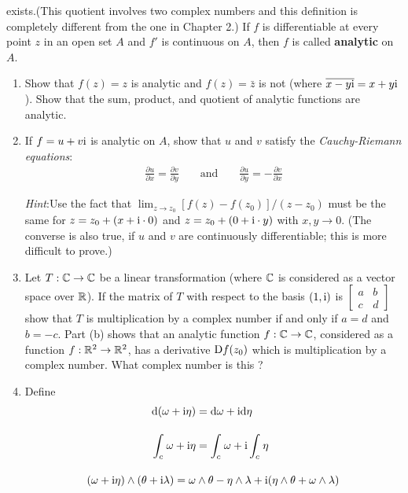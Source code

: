 \begin{problems}
{        exists.(This quotient involves two complex numbers and this
        definition is completely different from the one in Chapter 2.)
        If $f$ is differentiable at every point $z$ in an open set $A$ and $f'$ is
        continuous on $A$, then $f$ is called \textbf{analytic} on $A$.
        \begin{enumerate}[label=(\alph*)]
            \item Show that $f(z)=z$ is analytic and $f(z)=\bar{z}$ is not (where $\overline{x-y\mathrm{i}} = x+y\mathrm{i}$).
                    Show that the sum, product, and quotient of analytic functions are analytic. 
            \item If $f=u+v\mathrm{i}$ is analytic on $A$, show that $u$ and $v$ satisfy the \textit{Cauchy-Riemann equations}:
                \begin{align*}
                    \frac{\partial u}{\partial x} = \frac{\partial v}{\partial y} 
                    && \text{ and } && 
                    \frac{\partial u}{\partial y} = -\frac{\partial v}{\partial x}
                \end{align*}

                \textit{Hint}:Use the fact that $\lim_{z\to z_0}{[f(z)-f(z_0)]/(z-z_0)}$ must 
                be the same for $z=z_0+(x+\mathrm{i}\cdot 0)$ and $z=z_0+(0+\mathrm{i}\cdot y)$ with 
                $x,y\to 0$. (The converse is also true, if $u$ and $v$ are continuously differentiable;
                this is more difficult to prove.)
            \item Let $T:\mathbb{C}\to \mathbb{C}$ be a linear transformation (where $\mathbb{C}$ is considered 
                as a vector space over $\mathbb{R}$). If the matrix of $T$ with respect to the 
                basis $(1,\mathrm{i})$ is $\begin{bmatrix}a & b\\c & d\end{bmatrix}$ show that
                $T$ is multiplication by a complex number if and only if $a=d$ and $b=-c$. Part (b)
                shows that an analytic function $f:\mathbb{C}\to\mathbb{C}$, considered as a function $f:\mathbb{R}^2\to\mathbb{R}^2$,
                has a derivative $\mathrm{D}f(z_0)$ which is multiplication by a complex number. What complex number
                is this ?
            \item Define%
                \begin{align*}
                    \mathrm{d}(\omega + \mathrm{i}\eta) & = \mathrm{d}\omega + \mathrm{i}\mathrm{d}\eta \\[1em]
                    \int_{c}^{}{\omega + \mathrm{i}\eta} & = \int_{c}^{}\omega + \mathrm{i}\int_{c}^{}\eta \\[1em]
                    (\omega+\mathrm{i}\eta)\wedge(\theta+\mathrm{i}\lambda)
                        = \omega&\wedge\theta - \eta\wedge\lambda + \mathrm{i}(\eta\wedge\theta + \omega\wedge\lambda)
                \end{align*}


\end{enumerate}}
\end{problems}
